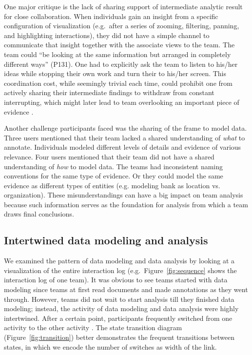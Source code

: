 One major critique is the lack of sharing support of intermediate analytic
result for close collaboration. When individuals gain an insight from a specific configuration of visualization (e.g.~after a series of zooming, filtering, panning, and highlighting interactions), they did not have a simple channel to communicate that insight together with the
associate views to the team. The team could ``be looking at the same
information but arranged in completely different ways'' (P131). One had to explicitly ask the team to listen to his/her ideas while stopping their own work and turn their to his/her screen. This coordination cost, while seemingly trivial each time, could prohibit one from actively sharing their intermediate findings to withdraw from constant interrupting, which might later lead to team overlooking an important piece of evidence \autocite{Borge2012}.

Another challenge participants faced was the sharing of the frame to model data. Three users mentioned that their team lacked a shared understanding of \emph{what} to annotate. Individuals modeled different levels of details and evidence of various relevance. Four users mentioned that their team did not have a shared understanding of \emph{how} to model data. The teams had inconsistent naming conventions for the same type of evidence. Or they could model the same evidence as different types of entities (e.g. modeling bank as location vs. organization). These misunderstandings can have a big impact on team analysis because such information serves as the foundation for analysis from which a team draws final conclusions.

\subsection{Intertwined data modeling and analysis}\label{Intertwined-data-modeling-and-analysis}

We examined the pattern of data modeling and data analysis by looking at a
visualization of the entire interaction log (e.g.~Figure~\ref{fig:sequence}
shows the interaction log of one team). It was obvious to see teams started with
data modeling since teams at first read documents and made annotations as they
went through. However, teams did not wait to start analysis till they finished
data modeling; instead, the activity of data modeling and data analysis were
highly intertwined. After a certain point, participants frequently switched from
one activity to the other activity . The state transition diagram
(Figure~\ref{fig:transition}) better demonstrates the frequent transitions
between states, in which we encode the number of switches as width of the link.

